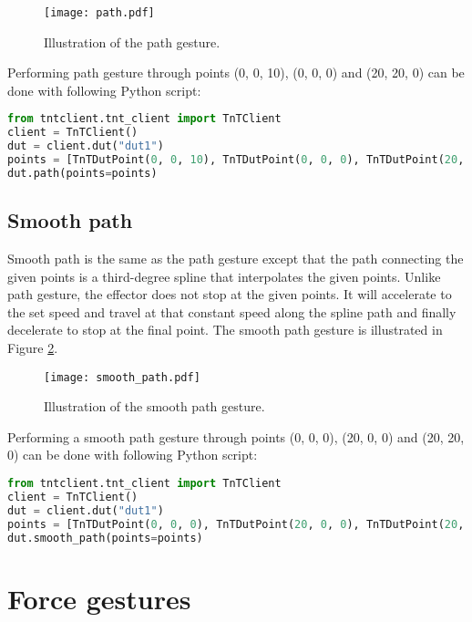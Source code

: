 \begin{figure}[h]
	\centering
	\texttt{[image: path.pdf]}
	\caption{Illustration of the path gesture.}
	\label{fig:path_gesture}
\end{figure}

Performing path gesture through points (0, 0, 10), (0, 0, 0) and (20, 20, 0) can be done with following Python script:

\begin{lstlisting}[language=Python]
from tntclient.tnt_client import TnTClient
client = TnTClient()
dut = client.dut("dut1")
points = [TnTDutPoint(0, 0, 10), TnTDutPoint(0, 0, 0), TnTDutPoint(20, 20, 0)]
dut.path(points=points)
\end{lstlisting}

\subsection{Smooth path}

Smooth path is the same as the path gesture except that the path connecting the given points is a third-degree spline that interpolates the given points. Unlike path gesture, the effector does not stop at the given points. It will accelerate to the set speed and travel at that constant speed along the spline path and finally decelerate to stop at the final point. The smooth path gesture is illustrated in Figure \ref{fig:smooth_path_gesture}.

\begin{figure}[h]
	\centering
	\texttt{[image: smooth\_path.pdf]}
	\caption{Illustration of the smooth path gesture.}
	\label{fig:smooth_path_gesture}
\end{figure}


Performing a smooth path gesture through points (0, 0, 0), (20, 0, 0) and (20, 20, 0) can be done with following Python script:

\begin{lstlisting}[language=Python]
from tntclient.tnt_client import TnTClient
client = TnTClient()
dut = client.dut("dut1")
points = [TnTDutPoint(0, 0, 0), TnTDutPoint(20, 0, 0), TnTDutPoint(20, 20, 0)]
dut.smooth_path(points=points)
\end{lstlisting}

\section{Force gestures}

